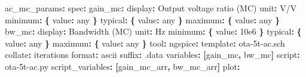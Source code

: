 \documentclass[
]{article}
\newenvironment{Shaded}{}{}
\newcommand{\AttributeTok}[1]{\textcolor[rgb]{0.49,0.56,0.16}{#1}}
\newcommand{\FloatTok}[1]{\textcolor[rgb]{0.25,0.63,0.44}{#1}}
\newcommand{\FunctionTok}[1]{\textcolor[rgb]{0.02,0.16,0.49}{#1}}
\newcommand{\KeywordTok}[1]{\textcolor[rgb]{0.00,0.44,0.13}{\textbf{#1}}}
\begin{document}
\begin{Shaded}
\begin{Highlighting}[]
\FunctionTok{ac\_mc\_params}\KeywordTok{:}
\AttributeTok{  }\FunctionTok{spec}\KeywordTok{:}
\AttributeTok{    }\FunctionTok{gain\_mc}\KeywordTok{:}
\AttributeTok{      }\FunctionTok{display}\KeywordTok{:}\AttributeTok{ Output voltage ratio (MC)}
\AttributeTok{      }\FunctionTok{unit}\KeywordTok{:}\AttributeTok{ V/V}
\AttributeTok{      }\FunctionTok{minimum}\KeywordTok{:}\AttributeTok{ }\KeywordTok{\{}\AttributeTok{ }\FunctionTok{value}\KeywordTok{:}\AttributeTok{ any }\KeywordTok{\}}
\AttributeTok{      }\FunctionTok{typical}\KeywordTok{:}\AttributeTok{ }\KeywordTok{\{}\AttributeTok{ }\FunctionTok{value}\KeywordTok{:}\AttributeTok{ any }\KeywordTok{\}}
\AttributeTok{      }\FunctionTok{maximum}\KeywordTok{:}\AttributeTok{ }\KeywordTok{\{}\AttributeTok{ }\FunctionTok{value}\KeywordTok{:}\AttributeTok{ any }\KeywordTok{\}}
\AttributeTok{    }\FunctionTok{bw\_mc}\KeywordTok{:}
\AttributeTok{      }\FunctionTok{display}\KeywordTok{:}\AttributeTok{ Bandwidth (MC)}
\AttributeTok{      }\FunctionTok{unit}\KeywordTok{:}\AttributeTok{ Hz}
\AttributeTok{      }\FunctionTok{minimum}\KeywordTok{:}\AttributeTok{ }\KeywordTok{\{}\AttributeTok{ }\FunctionTok{value}\KeywordTok{:}\AttributeTok{ }\FloatTok{10e6}\AttributeTok{ }\KeywordTok{\}}
\AttributeTok{      }\FunctionTok{typical}\KeywordTok{:}\AttributeTok{ }\KeywordTok{\{}\AttributeTok{ }\FunctionTok{value}\KeywordTok{:}\AttributeTok{ any }\KeywordTok{\}}
\AttributeTok{      }\FunctionTok{maximum}\KeywordTok{:}\AttributeTok{ }\KeywordTok{\{}\AttributeTok{ }\FunctionTok{value}\KeywordTok{:}\AttributeTok{ any }\KeywordTok{\}}
\AttributeTok{  }\FunctionTok{tool}\KeywordTok{:}
\AttributeTok{    }\FunctionTok{ngspice}\KeywordTok{:}
\AttributeTok{      }\FunctionTok{template}\KeywordTok{:}\AttributeTok{ ota{-}5t{-}ac.sch}
\AttributeTok{      }\FunctionTok{collate}\KeywordTok{:}\AttributeTok{ iterations}
\AttributeTok{      }\FunctionTok{format}\KeywordTok{:}\AttributeTok{ ascii}
\AttributeTok{      }\FunctionTok{suffix}\KeywordTok{:}\AttributeTok{ .data}
\AttributeTok{      }\FunctionTok{variables}\KeywordTok{:}\AttributeTok{ }\KeywordTok{[}\AttributeTok{gain\_mc}\KeywordTok{,}\AttributeTok{ bw\_mc}\KeywordTok{]}
\AttributeTok{      }\FunctionTok{script}\KeywordTok{:}\AttributeTok{ ota{-}5t{-}ac.py}
\AttributeTok{      }\FunctionTok{script\_variables}\KeywordTok{:}\AttributeTok{ }\KeywordTok{[}\AttributeTok{gain\_mc\_arr}\KeywordTok{,}\AttributeTok{ bw\_mc\_arr}\KeywordTok{]}
\AttributeTok{  }\FunctionTok{plot}\KeywordTok{:}

\end{Highlighting}
\end{Shaded}
\end{document}
